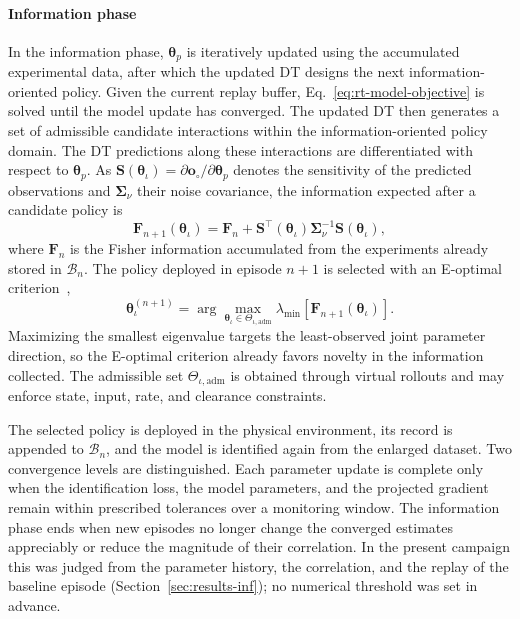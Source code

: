\documentclass[journal]{IEEEtran}
\begin{document}
\paragraph*{Information phase}
In the information phase, $\boldsymbol{\theta}_{p}$ is iteratively updated using the accumulated experimental data, after which the updated DT designs the next information-oriented policy. Given the current replay buffer, Eq.~\eqref{eq:rt-model-objective} is solved until the model update has converged. The updated DT then generates a set of admissible candidate interactions within the information-oriented policy domain. The DT predictions along these interactions are differentiated with respect to $\boldsymbol{\theta}_p$. As $\mathbf S(\boldsymbol{\theta}_{\iota})=\partial\mathbf o_{\circ}/\partial\boldsymbol{\theta}_p$ denotes the sensitivity of the predicted observations and $\boldsymbol{\Sigma}_{\nu}$ their noise covariance, the information expected after a candidate policy is
\begin{equation}
\mathbf F_{n+1}(\boldsymbol{\theta}_{\iota})
=
\mathbf F_n+
\mathbf S^{\top}(\boldsymbol{\theta}_{\iota})
\boldsymbol{\Sigma}_{\nu}^{-1}
\mathbf S(\boldsymbol{\theta}_{\iota}),
\label{eq:rt-fisher-update}
\end{equation}
where $\mathbf F_n$ is the Fisher information accumulated from the experiments already stored in $\mathcal B_n$. The policy deployed in episode $n+1$ is selected with an E-optimal criterion~\cite{Mehra1974,Goodwin1977,Franceschini2008},
\begin{equation}
\boldsymbol{\theta}_{\iota}^{(n+1)}
=
\arg\max_{\boldsymbol{\theta}_{\iota}\in\Theta_{\iota,\mathrm{adm}}}
\lambda_{\min}\!\left[
\mathbf F_{n+1}(\boldsymbol{\theta}_{\iota})
\right].
\label{eq:rt-e-optimal}
\end{equation}
Maximizing the smallest eigenvalue targets the least-observed joint parameter direction, so the E-optimal criterion already favors novelty in the information collected. The admissible set $\Theta_{\iota,\mathrm{adm}}$ is obtained through virtual rollouts and may enforce state, input, rate, and clearance constraints.

The selected policy is deployed in the physical environment, its record is appended to $\mathcal B_n$, and the model is identified again from the enlarged dataset. Two convergence levels are distinguished. Each parameter update is complete only when the identification loss, the model parameters, and the projected gradient remain within prescribed tolerances over a monitoring window. The information phase ends when new episodes no longer change the converged estimates appreciably or reduce the magnitude of their correlation. In the present campaign this was judged from the parameter history, the correlation, and the replay of the baseline episode (Section~\ref{sec:results-inf}); no numerical threshold was set in advance.
\end{document}
